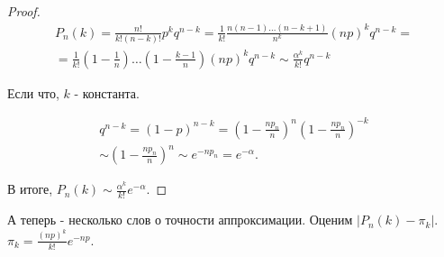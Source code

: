 \documentclass[a4paper,100pt]{article}
\theoremstyle{indented}
\theoremstyle{definition}
\theoremstyle{remark}
\begin{document}
\begin{proof}
  \begin{equation*}
      \begin{split}
          P_n(k)=\frac{n!}{k!(n-k)!}p^kq^{n-k}=\frac{1}{k!}\frac{n(n-1)\ldots(n-k+1)}{n^k}(np)^kq^{n-k}= \\ 
          = \frac{1}{k!}{(1-\frac{1}{n})\ldots(1-\frac{k-1}{n})}(np)^kq^{n-k}\sim\frac{\alpha^k}{k!}q^{n-k}
      \end{split}
  \end{equation*}

  Если что, $k$ - константа. 

  \begin{equation*}
      \begin{split}
          q^{n-k}=(1-p)^{n-k}=(1-\frac{n p_n}{n})^n(1-\frac{n p_n}{n})^{-k} \\ 
          \sim (1-\frac{n p_n}{n})^n \sim e^{-n p_n} = e^{-\alpha}. 
      \end{split}
  \end{equation*}

  В итоге, $P_n(k)\sim\frac{\alpha^k}{k!}e^{-\alpha}$. 

\end{proof}

А теперь - несколько слов о точности аппроксимации. Оценим $|P_n(k)-\pi_k|$. $\pi_k=\frac{(np)^k}{k!}e^{-np}$. \\
\end{document}

